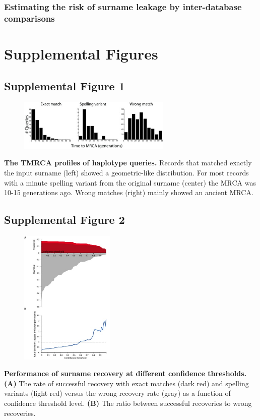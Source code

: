 \subsubsection{Estimating the risk of surname leakage by inter-database comparisons}

\pagebreak
\section{Supplemental Figures}
\subsection{Supplemental Figure 1}
\begin{figure}[h!]
\centering
\label{fig:sursup1}
\includegraphics[width=0.65\textwidth]{Figures/App1/SuppFig1.jpg}
\end{figure}
\textbf{The TMRCA profiles of haplotype queries.} Records that matched exactly the input surname (left) showed a geometric-like distribution. For most records with a minute spelling variant from the original surname (center) the  MRCA was 10-15 generations ago. Wrong matches (right) mainly showed an ancient MRCA.

\pagebreak
\subsection{Supplemental Figure 2}
\begin{figure}[h!]
\centering
\label{fig:sursup2}
\includegraphics[width=0.4\textwidth]{Figures/App1/SuppFig2.jpg}
\end{figure}
\textbf{Performance of surname recovery at different confidence thresholds.} \textbf{(A)} The rate of successful recovery with exact matches (dark red) and spelling variants (light red) versus the wrong recovery rate (gray) as a function of confidence threshold level. \textbf{(B)} The ratio between successful recoveries to wrong recoveries.

